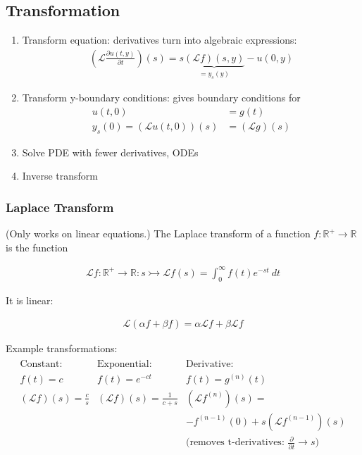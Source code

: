 \subsection{Transformation}\label{subsec:transformation}
\begin{enumerate}
    \item{
        Transform equation: derivatives turn into algebraic expressions:
        \begin{align*}
            \left(
            \mathcal{L}\frac{\partial u(t,y)}{\partial t}
            \right)(s) =
            s
            \underbrace{(\mathcal{L}f)(s, y)}_{=y_s(y)}
            -u(0,y)
        \end{align*}
    }
    \item{
        Transform y-boundary conditions: gives boundary conditions for
        \begin{align*}
            u(t,0) & =g(t) \\
            y_s(0)=(\mathcal{L}u(t,0))(s) & = (\mathcal{L}g)(s)
        \end{align*}
    }
    \item Solve PDE with fewer derivatives, ODEs
    \item Inverse transform
\end{enumerate}

\subsubsection{Laplace Transform}

(Only works on linear equations.)
The Laplace transform of a function $f:\mathbb{R}^+\to \mathbb{R}$ is the function

\begin{align*}
    \mathcal{L}f : \mathbb{R}^+\to \mathbb{R} : s \rightarrowtail \mathcal{L}f(s) = \int_0^\infty f(t)e^{-st}\ dt
\end{align*}

It is linear:

\begin{align*}
	\mathcal{L}(\alpha f+\beta f)=\alpha\mathcal{L}f+\beta\mathcal{L}f
\end{align*}

Example transformations:
\begin{align*}
	\begin{matrix}
		\text{Constant: } & \text{Exponential: } & \text{Derivative: } \\
		f(t)=c & f(t)=e^{-ct} & f(t)=g^{(n)}(t) \\
		(\mathcal{L}f)(s) = \frac{c}{s} & (\mathcal{L}f)(s) = \frac{1}{c+s} & (\mathcal{L}f^{(n)})(s)= \\
		& & -f^{(n-1)}(0)+s\left(\mathcal{L}f^{(n-1)}\right)(s) \\
		& & \text{(removes t-derivatives: }\frac{\partial}{\partial t}\rightarrow s\text{)}
	\end{matrix}
\end{align*}

